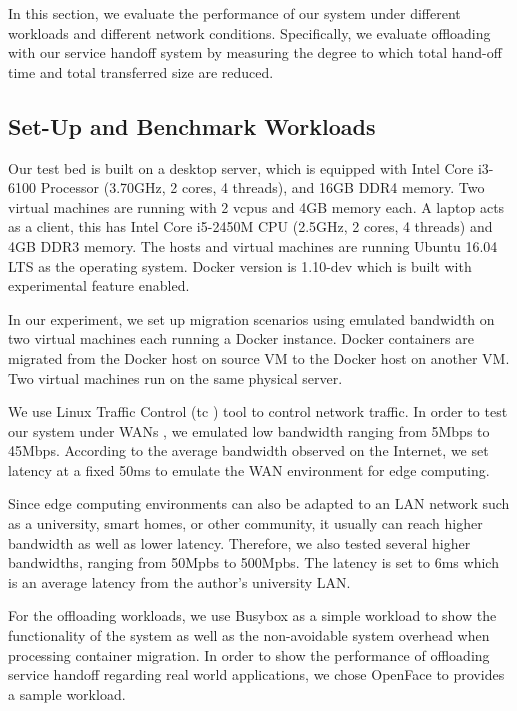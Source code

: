 
In this section, we evaluate the performance of our system under different workloads and different network conditions. 
Specifically, we evaluate offloading with our service handoff system by measuring the degree to which total hand-off time and total transferred size are reduced.

\subsection{Set-Up and Benchmark Workloads}

Our test bed is built on a desktop server, which is equipped with Intel Core i3-6100 Processor (3.70GHz, 2 cores, 4 threads), and 16GB DDR4 memory. Two virtual machines are running with 2 vcpus and 4GB memory each.
A laptop acts as a client, this has Intel Core i5-2450M CPU (2.5GHz, 2 cores, 4 threads) and 4GB DDR3 memory. 
The hosts and virtual machines are running Ubuntu 16.04 LTS as the operating system. Docker version is 1.10-dev which is built with experimental feature enabled.

In our experiment, we set up migration scenarios using 
emulated bandwidth on two virtual machines each running a Docker instance.
Docker containers are migrated from the Docker host on source VM to the Docker host on another VM. 
Two virtual machines run on the same physical server. 

We use Linux Traffic Control (tc\cite{tc} )  tool to control network traffic. In order to test our system under WANs , we emulated low bandwidth ranging from 5Mbps to 45Mbps. According to the average bandwidth observed on the Internet\cite{internet2014state}, we set  latency at a fixed 50ms to emulate the WAN environment for edge computing.

Since edge computing environments can also be adapted to an LAN network such as a university, smart homes, or other community, it usually can reach higher bandwidth as well as lower latency. Therefore, we also tested several higher bandwidths, ranging from 50Mpbs to 500Mpbs. The latency is set to 6ms which is an average latency from the author's university LAN.

For the offloading workloads, we use Busybox as a simple workload to show the functionality of the system as well as the non-avoidable system overhead when processing container migration. In order to show the performance of offloading service handoff regarding real world applications, we chose OpenFace to provides a sample workload.

